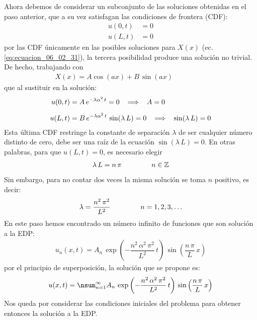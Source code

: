 Ahora debemos de considerar un subconjunto de las soluciones obtenidas en el paso anterior, que a su vez satisfagan las condiciones de frontera (CDF):
\begin{align*}
u (0, t) &= 0 \\[0.5em]
u (L, t) &= 0
\end{align*}
por las CDF únicamente en las posibles soluciones para $X (x)$ (ec. \ref{eq:ecuacion_06_02_31}), la tercera posibilidad produce una solución no trivial. De hecho, trabajando con
\begin{align*}
X (x) = A \cos (a x) + B \, \sin (a x) \hspace{2cm}
\end{align*}
que al sustituir en la solución:
\begin{align*}
u (0, t) &= A \, e^{-\lambda \alpha^{2} \, t} = 0 \hspace{0.3cm} \Longrightarrow \hspace{0.3cm} A = 0 \\[0.5em]
u (L, t) &= B \, e^{-\lambda \alpha^{2} \, t} \, \sin (\lambda \, L) = 0 \hspace{0.3cm} \Longrightarrow \hspace{0.3cm} \sin (\lambda \, L) = 0
\end{align*}
Esta última CDF restringe la constante de separación $\lambda$ de ser cualquier número distinto de cero, debe ser una raíz de la ecuación $\sin (\lambda \, L) = 0$. En otras palabras, para que $u (L, t) = 0$, es necesario elegir
\begin{align}
\lambda \, L = n \, \pi \hspace{1.5cm} n \in \mathbb{Z}
\label{eq:ecuacion_06_02_34}    
\end{align}
Sin embargo, para no contar dos veces la misma solución se toma $n$ positivo, es decir:
\begin{align}
\lambda = \dfrac{n^{2} \, \pi^{2}}{L^{2}} \hspace{1.5cm} n = 1, 2, 3, \ldots
\label{eq:ecuacion_06_02_35}
\end{align}
En este paso hemos encontrado un número infinito de funciones que son solución a la EDP:
\begin{align}
u_{n} (x, t) = A_{n} \, \exp \left( - \dfrac{n^{2} \, \alpha^{2} \, \pi^{2}}{L^{2}} \, t \right) \, \sin \left( \dfrac{n \, \pi}{L} \, x \right)
\label{eq:ecuacion_06_02_37}    
\end{align}
por el principio de superposición, la solución que se propone es:
\begin{align}
u (x, t) = \nsum_{n=1}^{\infty} A_{n} \, \exp \left( - \dfrac{n^{2} \, \alpha^{2} \, \pi^{2}}{L^{2}} \, t \right) \, \sin \left( \dfrac{n \, \pi}{L} \, x \right)
\label{eq:ecuacion_06_02_38}
\end{align}
Nos queda por considerar las condiciones iniciales del problema para obtener entonces la solución a la EDP.

